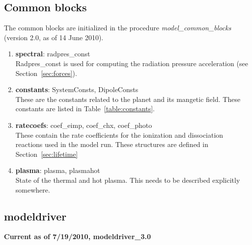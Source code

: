 \documentclass[11pt]{article}
\begin{document}
\subsection{Common blocks}
The common blocks are initialized in the procedure
\textit{model\_common\_blocks} (version 2.0, as of 14 June 2010). 
\begin{enumerate}
\item \textbf{spectral}: radpres\_const \\
Radpres\_const is used for computing the radiation pressure acceleration (see
Section~\ref{sec:forces}).

\item \textbf{constants}: SystemConsts, DipoleConsts \\
These are the constants related to the planet and its mangetic field. These
constants are listed in Table~\ref{table:constants}.

\item \textbf{ratecoefs}: coef\_eimp, coef\_chx, coef\_photo \\
These contain the rate coefficients for the ionization and dissociation
reactions used in the model run. These structures are defined in
Section~\ref{sec:lifetime}

\item \textbf{plasma}: plasma, plasmahot \\
State of the thermal and hot plasma. This needs to be described explicitly
somewhere.
\end{enumerate}


\subsection{modeldriver}

\textbf{Current as of 7/19/2010, modeldriver\_3.0}
\end{document}

